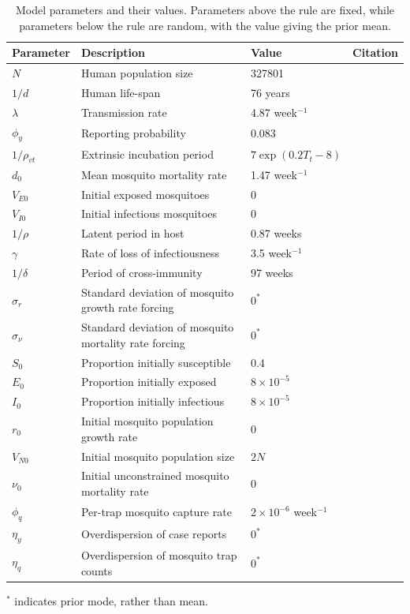 \documentclass[10pt,letterpaper]{article}
\begin{document}
\begin{table}[!ht]
\label{parameters}
\begin{adjustwidth}{-2.25in}{0in} 
\begin{center}
\caption{Model parameters and their values.  Parameters above the rule are fixed, while parameters below the rule are random, with the value giving the prior mean.}
\begin{tabular}{llll}
Parameter & Description & Value & Citation\\
\hline
$N$ & Human population size & 327801 & \cite{vitpop} \\
$1/d$ & Human life-span & 76 years & \cite{vitlong} \\
$\lambda$ & Transmission rate & 4.87 week$^{-1}$ & \cite{Scott2000}\\
$\phi_y$ & Reporting probability & 0.083 & \cite{Silva2016}\\
$1/\rho_{vt}$ & Extrinsic incubation period & $7\exp \left( 0.2 T_t - 8 \right)$ & \cite{Chan2012}\\
$d_0$ & Mean mosquito mortality rate & 1.47 week$^{-1}$ & \cite{Brady2013} \\
$V_{E0}$ & Initial exposed mosquitoes &  0 & \\
$V_{I0}$ & Initial infectious mosquitoes & 0 & \\
\hline
$1/\rho$ & Latent period in host & 0.87 weeks  & \cite{Chan2012}\\
$\gamma$ & Rate of loss of infectiousness & 3.5 week$^{-1}$ & \cite{Nguyet2013}\\
$1/\delta$ & Period of cross-immunity & 97 weeks &  \cite{Reich2013}\\
$\sigma_r$ & Standard deviation of mosquito growth rate forcing & $0^*$ & \\
$\sigma_{\nu}$ & Standard deviation of mosquito mortality rate forcing & $0^*$ & \\
$S_0$ & Proportion initially susceptible & 0.4 & \cite{Cardoso2011a} \\
$E_0$ & Proportion initially exposed & $8\times 10 ^ {-5}$ & \\
$I_0$ & Proportion initially infectious & $8\times 10 ^ {-5}$ & \\
$r_0$ & Initial mosquito population growth rate & 0 & \\
$V_{N0}$ & Initial mosquito population size & $2N$ & \\
$\nu_0$ & Initial unconstrained mosquito mortality rate & 0 & \\
$\phi_q$ & Per-trap mosquito capture rate & $2 \times 10^{-6}$ week$^{-1}$ & \\
$\eta_y$ & Overdispersion of case reports & $0^*$ & \\
$\eta_q$ & Overdispersion of mosquito trap counts & $0^*$ & \\
\end{tabular}
\end{center}
\end{adjustwidth}
$^*$ indicates prior mode, rather than mean.
\end{table}
\end{document}
